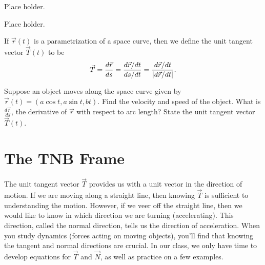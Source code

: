 \begin{problem}
Place holder. 
\end{problem}

\begin{problem}%
Place holder. 
\end{problem}


\begin{definition}
 If $\vec r(t)$ is a parametrization of a space curve, then we define the unit tangent vector $\vec T(t)$ to be 
$$\vec T = \displaystyle\frac{d\vec r}{ds}=\displaystyle\frac{d\vec r/dt}{ds/dt} = \frac{d\vec r/dt}{|d \vec r/dt|}.$$
\end{definition}

\begin{problem}
%
 Suppose an object moves along the space curve given by  $\vec r(t)=(a\cos t,a\sin t,b t)$. Find the velocity and speed of the object. What is $\frac{d\vec r}{ds}$, the derivative of $\vec r$ with respect to arc length?  State the unit tangent vector $\vec T(t)$.
\end{problem}

\section{The TNB Frame}
The unit tangent vector $\vec T$ provides us with a unit vector in the direction of motion. If we are moving along a straight line, then knowing $\vec T$ is sufficient to understanding the motion.  However, if we veer off the straight line, then we would like to know in which direction we are turning (accelerating).  This direction, called the normal direction, tells us the direction of acceleration. When you study dynamics (forces acting on moving objects), you'll find that knowing the tangent and normal directions are crucial. In our class, we only have time to develop equations for $\vec T$ and $\vec N$, as well as practice on a few examples. 

